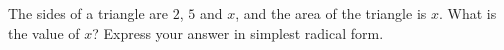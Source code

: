 The sides of a triangle are $2$, $5$ and $x$, and the area of the triangle is $x$. What is the value of $x$? Express your answer in simplest radical form.
